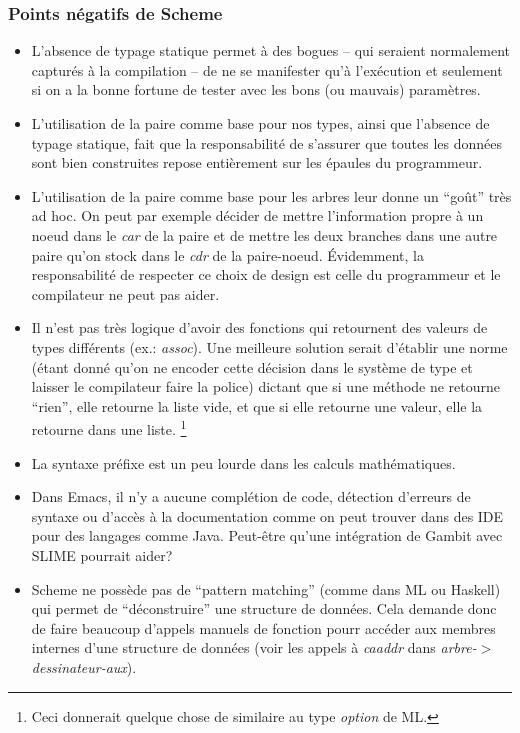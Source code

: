 \documentclass[10pt]{report}
\begin{document}
\subsubsection{Points négatifs de Scheme}
\begin{itemize}
\item L'absence de typage statique permet à des bogues -- qui seraient
  normalement capturés à la compilation -- de ne se manifester qu'à
  l'exécution et seulement si on a la bonne fortune de tester avec les
  bons (ou mauvais) paramètres.
\item L'utilisation de la paire comme base pour nos types, ainsi que
  l'absence de typage statique, fait que la responsabilité de
  s'assurer que toutes les données sont bien construites repose
  entièrement sur les épaules du programmeur.
\item L'utilisation de la paire comme base pour les arbres leur donne
  un ``goût'' très ad hoc.  On peut par exemple décider de mettre
  l'information propre à un noeud dans le \emph{car} de la paire et de
  mettre les deux branches dans une autre paire qu'on stock dans le
  \emph{cdr} de la paire-noeud.  Évidemment, la responsabilité de
  respecter ce choix de design est celle du programmeur et le
  compilateur ne peut pas aider.
\item Il n'est pas très logique d'avoir des fonctions qui retournent
  des valeurs de types différents (ex.: \emph{assoc}).  Une meilleure
  solution serait d'établir une norme (étant donné qu'on ne encoder
  cette décision dans le système de type et laisser le compilateur
  faire la police) dictant que si une méthode ne retourne ``rien'',
  elle retourne la liste vide, et que si elle retourne une valeur,
  elle la retourne dans une liste. \footnote{Ceci donnerait quelque
    chose de similaire au type \emph{option} de ML.}
\item La syntaxe préfixe est un peu lourde dans les calculs
  mathématiques.
\item Dans Emacs, il n'y a aucune complétion de code, détection
  d'erreurs de syntaxe ou d'accès à la documentation comme on peut
  trouver dans des IDE pour des langages comme Java.  Peut-être qu'une
  intégration de Gambit avec SLIME pourrait aider?
\item Scheme ne possède pas de ``pattern matching'' (comme dans ML ou
  Haskell) qui permet de ``déconstruire'' une structure de données.
  Cela demande donc de faire beaucoup d'appels manuels de fonction
  pourr accéder aux membres internes d'une structure de données (voir
  les appels à \emph{caaddr} dans \emph{arbre-$>$dessinateur-aux}).
\end{itemize}
\end{document}
